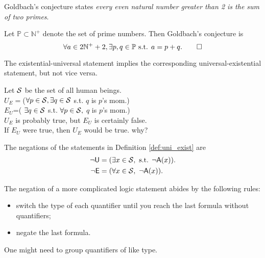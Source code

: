 \begin{exc}
  Goldbach's conjecture states
   \emph{every even natural number greater than 2
     is the sum of two primes}.
 \end{exc}
\begin{solution}
  Let $\mathbb{P}\subset \mathbb{N}^+$
   denote the set of prime numbers.
  Then Goldbach's conjecture is
  \begin{displaymath}
  \forall a\in 2\mathbb{N}^++2,
   \exists p,q\in \mathbb{P} \text{ s.t. } a=p+q.\qedhere
  \end{displaymath}
\end{solution}

\begin{thm}
   The existential-universal statement
    implies the corresponding universal-existential statement,
    but not vice versa.
 \end{thm}

 \begin{exm}
   Let ${\cal S}$ be the set of all human beings.\\
   $U_E=$($\forall p\in{\cal S}, \exists q\in{\cal S}$ s.t. $q$ is $p$'s mom.)
   \\
   $E_U$=( $\exists q\in{\cal S}$ s.t.
   $\forall p\in{\cal S}, $ $q$ is $p$'s mom.)\\
   $U_E$ is probably true, but $E_U$ is certainly false. \\
   If $E_U$ were true, then $U_E$ would be true. why?
 \end{exm}

\begin{axm}
  The negations of the statements in Definition \ref{def:uni_exist}
  are
  \begin{align}
  \neg \mathsf{U} &= (\exists x\in {\cal S},\text{ s.t. }
  \neg \mathsf{A}(x)).
  \\
  \neg \mathsf{E} &= (\forall x\in {\cal S},\ 
  \neg \mathsf{A}(x)).
  \end{align}
\end{axm}

\begin{rul}
  The negation of a more complicated logic statement
   abides by the following rules:
\begin{itemize}\itemsep0em
\item switch the type of each quantifier until
  you reach the last formula without quantifiers;
\item negate the last formula.
\end{itemize}
  One might need to group quantifiers of like type.
\end{rul}

